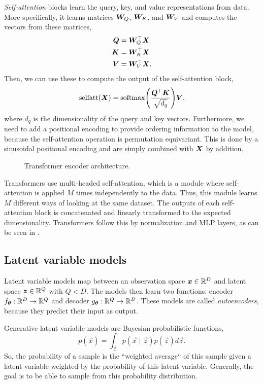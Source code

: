 \textit{Self-attention} blocks learn the query, key, and value representations
from data. More specifically, it learns matrices $\bm{W}_Q$, $\bm{W}_K$, and
$\bm{W}_V$ and computes the vectors from these matrices,
\begin{align*}
    \bm{Q} & = \bm{W}_Q^\top \bm{X}  \\
    \bm{K} & = \bm{W}_K^\top \bm{X}  \\
    \bm{V} & = \bm{W}_V^\top \bm{X}.
\end{align*}
Then, we can use these to compute the output of the self-attention block, \[
    \mathrm{selfatt}(\mat{X}) = \mathrm{softmax}\lft( \frac{\transpose{\mat{Q}} \mat{K}}{\sqrt{d_q}} \rgt) \mat{V},
\]
where $d_q$ is the dimensionality of the query and key vectors. Furthermore, we
need to add a positional encoding to provide ordering information to the model,
because the self-attention operation is permutation equivariant. This is done
by a sinusoidal positional encoding and are simply combined with $\bm{X}$ by
addition.

\begin{figure}[ht]
    \centering
    \caption{Transformer encoder architecture.}
    \label{fig:transformer}
\end{figure}

Transformers use multi-headed self-attention, which is a module where
self-attention is applied $M$ times independently to the data. Thus, this
module learns $M$ different ways of looking at the same dataset. The outputs
of each self-attention block is concatenated and linearly transformed to the
expected dimensionality. Transformers follow this by normalization and MLP
layers, as can be seen in .

\subsection{Latent variable models}

Latent variable models map between an observation space $\bm{x}\in\mathbb{R}^D$ and
latent space $\bm{z}\in\mathbb{R}^Q$ with $Q<D$. The models then learn two functions:
encoder $f_{\bm{\theta}}: \mathbb{R}^D \to \mathbb{R}^Q$ and decoder $g_{\bm{\theta}}: \mathbb{R}^Q
    \to \mathbb{R}^D$. These models are called \textit{autoencoders}, because they predict
their input as output.

Generative latent variable models are Bayesian probabilistic functions, \[
    p(\vec{x}) = \int_{\vec{z}} p(\vec{x}\mid\vec{z}) p(\vec{z}) d\vec{z}.
\]
So, the probability of a sample is the ``weighted average`` of this sample
given a latent variable weighted by the probability of this latent variable.
Generally, the goal is to be able to sample from this probability distribution.

